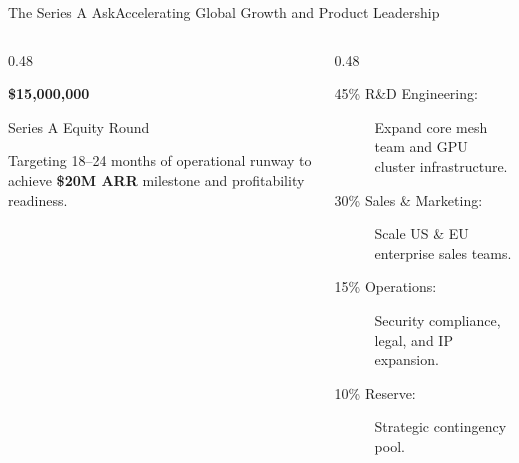 \documentclass[aspectratio=169,10pt]{beamer}
\begin{document}
\begin{frame}{The Series A Ask}{Accelerating Global Growth and Product Leadership}
  \begin{columns}[T]
    \begin{column}{0.48\textwidth}
      \begin{tcolorbox}[cyancard, title={\small\faDollarSign\ Funding Requirements}]
        \Large \bfseries \color{neoncyan} \$15,000,000
        \par\vspace*{0.15cm}
        \small \color{textmuted} Series A Equity Round
        \par\vspace*{0.25cm}
        \scriptsize
        Targeting 18--24 months of operational runway to achieve \textbf{\$20M ARR} milestone and profitability readiness.
      \end{tcolorbox}
    \end{column}
    
    \begin{column}{0.48\textwidth}
      \begin{tcolorbox}[emeraldcard, title={\small\faChartPie\ Planned Capital Allocation}]
        \small
        \begin{description}
          \item[45\% R\&D Engineering:] Expand core mesh team and GPU cluster infrastructure.
          \item[30\% Sales \& Marketing:] Scale US \& EU enterprise sales teams.
          \item[15\% Operations:] Security compliance, legal, and IP expansion.
          \item[10\% Reserve:] Strategic contingency pool.
        \end{description}
      \end{tcolorbox}
    \end{column}
  \end{columns}
\end{frame}
\end{document}
